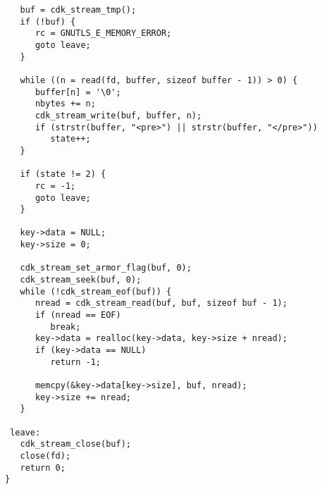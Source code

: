 \begin {verbatim}
   buf = cdk_stream_tmp();
   if (!buf) {
      rc = GNUTLS_E_MEMORY_ERROR;
      goto leave;
   }

   while ((n = read(fd, buffer, sizeof buffer - 1)) > 0) {
      buffer[n] = '\0';
      nbytes += n;
      cdk_stream_write(buf, buffer, n);
      if (strstr(buffer, "<pre>") || strstr(buffer, "</pre>"))
         state++;
   }

   if (state != 2) {
      rc = -1;
      goto leave;
   }

   key->data = NULL;
   key->size = 0;

   cdk_stream_set_armor_flag(buf, 0);
   cdk_stream_seek(buf, 0);
   while (!cdk_stream_eof(buf)) {
      nread = cdk_stream_read(buf, buf, sizeof buf - 1);
      if (nread == EOF)
         break;
      key->data = realloc(key->data, key->size + nread);
      if (key->data == NULL)
         return -1;

      memcpy(&key->data[key->size], buf, nread);
      key->size += nread;
   }

 leave:
   cdk_stream_close(buf);
   close(fd);
   return 0;
}


\end{verbatim}
